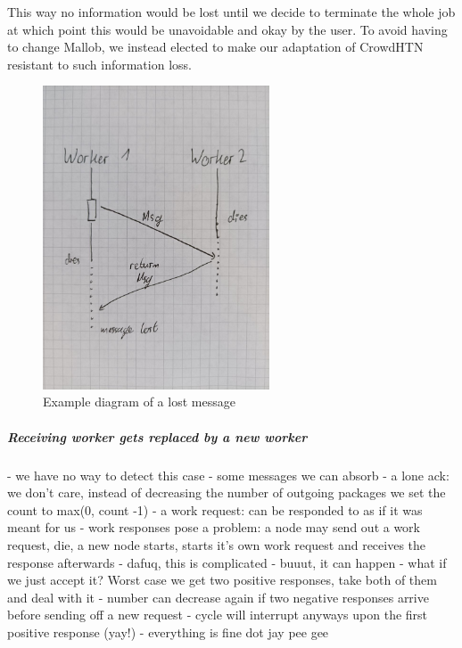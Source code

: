 This way no information would be lost until we decide to terminate the whole job at which point this would be unavoidable and okay by the user. To avoid having to change Mallob, we instead elected to make our adaptation of CrowdHTN resistant to such information loss.
\begin{figure}
	\includegraphics[width=0.6\textwidth]{images/prelim/malleable_lost_message}
	\caption{Example diagram of a lost message}
	\label{malleable: lost message}
\end{figure}

\subparagraph{Receiving worker gets replaced by a new worker}
- we have no way to detect this case
- some messages we can absorb
	- a lone ack: we don't care, instead of decreasing the number of outgoing packages we set the count to max(0, count -1)
	- a work request: can be responded to as if it was meant for us
	- work responses pose a problem: a node may send out a work request, die, a new node starts, starts it's own work request and receives the response afterwards
		- dafuq, this is complicated
		- buuut, it can happen
		- what if we just accept it? Worst case we get two positive responses, take both of them and deal with it
		- number can decrease again if two negative responses arrive before sending off a new request
		- cycle will interrupt anyways upon the first positive response (yay!)
	- everything is fine dot jay pee gee

